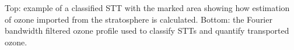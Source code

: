 \label{fig:sttquant}
Top: example of a classified STT with the marked area showing how estimation of ozone imported from the stratosphere is calculated.
Bottom: the Fourier bandwidth filtered ozone profile used to classify STTs and quantify transported ozone.